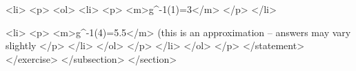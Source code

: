                         <li>
                            <p>
                                <ol>
                                    <li>
                                        <p>
                                            <m>g^{-1}(1)=3</m>
                                        </p>
                                    </li>

                                    <li>
                                        <p>
                                            <m>g^{-1}(4)=5.5</m> (this is an approximation – answers may vary slightly
                                        </p>
                                    </li>
                                </ol>
                            </p>
                        </li>
                    </ol>
                </p>
            </statement>
        </exercise>
    </subsection>
</section>